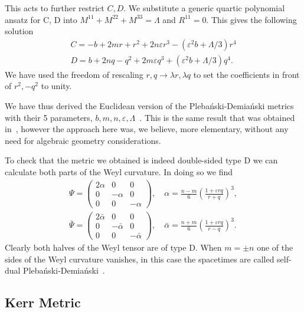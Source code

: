 \documentclass[10pt]{report}
\newcommand{\pleb}[0]{Pleba\'nski}
\newcommand{\demi}[0]{Demia\'nski}
\theoremstyle{definition}
\begin{document}
This acts to further restrict $C,D$. We substitute a generic quartic polynomial ansatz for C, D into $M^{11}+M^{22}+M^{33} = \Lambda$ and $R^{11} = 0$.
This gives the following solution
\begin{equation} \label{eq:PlebanskiDemianskiFinalSolution}
\begin{aligned}
    C = -b + 2mr +  r^2 + 2n\varepsilon r^3 - (\varepsilon^2 b + \Lambda/3) r^4 \\
    D = b + 2n q - q^2 + 2m\varepsilon q^3 + (\varepsilon^2 b + \Lambda/3) q^4.
\end{aligned}
\end{equation}
We have used the freedom of rescaling $r,q \rightarrow \lambda r, \lambda q$ to set the coefficients in front of $r^2, -q^2$ to unity.

We have thus derived the Euclidean version of the \pleb{}-\demi{} metrics with their 5 parameters, $b,m,n,\varepsilon,\Lambda$~\cite{RotatingChargPleban1976,ANewLookAtTGriffi2005}. This is the same result that was obtained in~\cite{AmbitoricGeomeAposto2013}, however the approach here was, we believe, more elementary, without any need for algebraic geometry considerations. 

To check that the metric we obtained is indeed double-sided type D we can calculate both parts of the Weyl curvature. In doing so we find
\begin{align}
    \Psi = \begin{pmatrix}
        2\alpha & 0 & 0 \\
        0 & -\alpha & 0  \\
        0 & 0 & -\alpha
    \end{pmatrix}, \quad \alpha = \frac{n-m}{6} \left( \frac{1+\varepsilon rq}{r+q} \right)^3, \\ \nonumber
    \bar{\Psi} = \begin{pmatrix}
        2\bar{\alpha} & 0 & 0 \\
        0 & -\bar{\alpha} & 0 \\
        0 & 0 & -\bar{\alpha}
    \end{pmatrix}, \quad \bar{\alpha} = \frac{n+m}{6} \left( \frac{1+\varepsilon rq}{r-q} \right)^3.
\end{align}
Clearly both halves of the Weyl tensor are of type D.
When $m = \pm n$ one of the sides of the Weyl curvature vanishes, in this case the spacetimes are called self-dual \pleb{}-\demi{}~\cite{KillingYanoTeNozawa2015}.


\subsection{Kerr Metric}\label{sec:PDMetricToKerrMetric}
\end{document}
